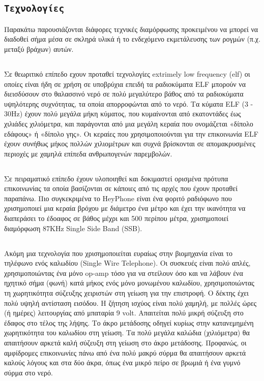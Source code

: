 \documentclass[12pt]{article}
\begin{document}
\begin{multicols}{2}
    \section{\texttt{\normalsize Τεχνολογίες}}
    Παρακάτω παρουσιάζονται διάφορες τεχνικές διαμόρφωσης προκειμένου να μπορεί να διαδοθεί σήμα μέσα σε σκληρά υλικά ή το ενδεχόμενο εκμετάλευσης των ρογμών (π.χ. μεταξύ βράχων) αυτών.

    \subsection{} Σε θεωριτικό επίπεδο εχουν προταθεί τεχνολογίες extrimely low frequency (elf) οι οποίες είναι ήδη σε χρήση σε υποβρύχια επειδή τα ραδιοκύματα ELF μπορούν να διεισδύσουν στο θαλασσινό νερό σε πολύ μεγαλύτερο βάθος από τα ραδιοκύματα υψηλότερης συχνότητας, τα οποία απορροφώνται από το νερό. Τα κύματα ELF (3 - 30Hz) έχουν πολύ μεγάλα μήκη κύματος, που κυμαίνονται από εκατοντάδες έως χιλιάδες χιλιόμετρα, και παράγονται από μια μεγάλη κεραία που ονομάζεται «δίπολο εδάφους» ή «δίπολο γης». Οι κεραίες που χρησιμοποιούνται για την επικοινωνία ELF έχουν συνήθως μήκος πολλών χιλιομέτρων και συχνά βρίσκονται σε απομακρυσμένες περιοχές με χαμηλά επίπεδα ανθρωπογενών παρεμβολών.

    \subsection{}
    Σε πειραματικό επίπεδο έχουν υλοποιηθεί και δοκιμαστεί ορισμένα πρότυπα επικοινωνίας τα οποία βασίζονται σε κάποιες από τις αρχές που έχουν προταθεί παραπάνω. Πιο συγκεκριμένα το HeyPhone είναι ένα φοριτό ραδιόφωνο που χρισημοποιεί μια κεραία βρόχου με διάμετρο ένα μέτρο και έχει την ικανότητα να διαπεράσει το έδοαφος σε βάθος μέχρι και 500 περίπου μέτρα, χρισημοποιεί διαμόρφωση 87KHz Single Side Band (SSB).
    \subsection{}
    Ακόμη μια τεχνολογία που χρισημοποιείται ευραίως στην βιομηχανία είναι το τηλέφωνο ενός καλωδίου (Single Wire Telephone). Οι συσκευές είναι πολύ απλές, χρησιμοποιώντας ένα μόνο op-amp τόσο για να στείλουν όσο και να λάβουν ένα ηχητικό σήμα (φωνή) κατά μήκος ενός μόνο μονωμένου καλωδίου, χρησιμοποιώντας τη χωρητικότητα σύζευξης χειριστών στη γείωση για την επιστροφή. Ο δέκτης έχει πολύ υψηλή αντίσταση εισόδου. Η ζήτηση ισχύος είναι πολύ χαμηλή, με πολλές ώρες (ή ημέρες) λειτουργίας από μπαταρία 9 volt. Απαιτείται πολύ μικρή σύζευξη στο έδαφος στο τέλος της λήψης. Το άκρο μετάδοσης οδηγεί κυρίως στην κατανεμημένη χωρητικότητα του καλωδίου στη γείωση. Τα πολύ μεγάλα καλώδια (χιλιόμετρα) θα απαιτήσουν αρκετά καλή σύζευξη στη γείωση στο άκρο μετάδοσης. Προφανώς, οι αμφίδρομες επικοινωνίες πάνω από ένα πολύ μακρύ σύρμα θα απαιτήσουν αρκετά καλούς λόγους και στα δύο άκρα, όπως ένα μικρό πείρο σε βρωμιά ή ένα γυμνό σύρμα στο νερό.


\end{multicols}
\end{document}

